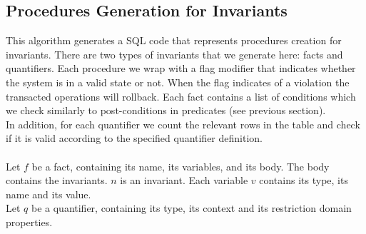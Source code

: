 \documentclass[oneside]{book}
\begin{document}
\newpage

\subsection{Procedures Generation for Invariants}

This algorithm generates a SQL code that represents procedures creation for invariants. There are two types of invariants that we generate here: facts and quantifiers. Each procedure we wrap with a flag modifier that indicates whether the system is in a valid state or not. When the flag indicates of a violation the transacted operations will rollback. Each fact contains a list of conditions which we check similarly to post-conditions in predicates (see previous section).\\
In addition, for each quantifier we count the relevant rows in the table and check if it is valid according to the specified quantifier definition.
\\\\
Let $f$ be a fact, containing its name, its variables, and its body. The body contains the invariants. $n$ is an invariant. Each variable $v$ contains its type, its name and its value.\\
Let $q$ be a quantifier, containing its type, its context and its restriction domain properties.
\end{document}
